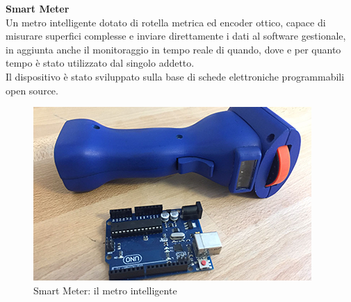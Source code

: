\noindent \textbf{Smart Meter}
\\
Un metro intelligente dotato di rotella metrica ed encoder ottico, capace di misurare superfici complesse e inviare direttamente i dati al software gestionale, in aggiunta anche il monitoraggio in tempo reale di quando, dove e per quanto tempo è stato utilizzato dal singolo addetto.\\
Il dispositivo è stato sviluppato sulla base di schede elettroniche programmabili open source.
\\
\begin{figure}[H]
	\begin{center}
	\includegraphics[scale=0.6]{immagini/smartmeter.png}
	\caption{Smart Meter: il metro intelligente}
	\end{center}
\end{figure}

